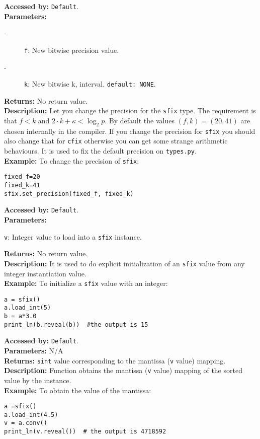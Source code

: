 			\textbf{Accessed by:} \verb|Default|.\\
    		\textbf{Parameters:}
     		\begin{description}
	     		\item[-] \verb|f|: New bitwise precision  value.
	    		\item[-] \verb|k|: New bitwise k, interval. \verb|default: NONE|.
    		\end{description}
    		\textbf{Returns:} No return value. \\
     		\textbf{Description:}
				Let you change the precision for the \verb|sfix| type. 
                                The requirement is that $f<k$ and $2 \cdot k + \kappa < \log_2 p$.
                                By default the values $(f,k)=(20,41)$ are chosen internally in the compiler.
                                If you change the precision for \verb|sfix| you should also change that for
                                \verb|cfix| otherwise you can get some strange arithmetic behaviours. 
                                It is used to fix the default precision on \verb|types.py|.  \\
			\textbf{Example:}
				To change the precision of \verb|sfix|:
\begin{lstlisting}
fixed_f=20
fixed_k=41
sfix.set_precision(fixed_f, fixed_k)
\end{lstlisting}
     			
			\textbf{Accessed by:} \verb|Default|.		 \\
			\textbf{Parameters:}
			\begin{description}
				\item \verb|v|: Integer value to load into a \verb|sfix| instance.
			\end{description}
			\textbf{Returns:} No return value. \\
			\textbf{Description:}
				 It is used to do explicit initialization of an \verb|sfix| value from any integer instantiation value. \\
	     	\textbf{Example:}
    		    To initialize a \verb|sfix| value with an integer:
\begin{lstlisting}
a = sfix()
a.load_int(5)
b = a*3.0
print_ln(b.reveal(b))  #the output is 15   	
\end{lstlisting}	 
			\textbf{Accessed by:} \verb|Default|.		 \\
			\textbf{Parameters:} N/A \\
			\textbf{Returns:} \verb|sint| value corresponding to the mantissa (\verb|v| value) mapping. \\
			\textbf{Description:}
				Function obtains the mantissa (\verb|v| value) mapping of the sorted value by the instance. \\
	     	\textbf{Example:}
    		    To obtain the value of the mantissa:
\begin{lstlisting}
a =sfix()
a.load_int(4.5)
v = a.conv()
print_ln(v.reveal())  # the output is 4718592   	
\end{lstlisting}	 
		
